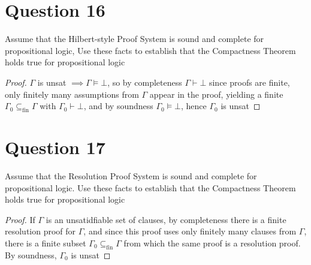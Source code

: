 \documentclass{article}
\begin{document}
\section*{Question 16}
Assume that the Hilbert-style Proof System is sound and complete for propositional logic, Use these facts to establish that the Compactness Theorem holds true for propositional logic
\begin{proof}
    $\Gamma$ is unsat $\implies\Gamma \models \bot$, so by completeness $\Gamma \vdash \bot$ since proofs are finite, only finitely many assumptions from $\Gamma$ appear in the proof, yielding a finite $\Gamma_0 \subseteq_{\mathrm{fin}} \Gamma$ with $\Gamma_0 \vdash \bot$, 
    and by soundness $\Gamma_0 \models \bot$, hence $\Gamma_0$ is unsat
    \end{proof}
\section*{Question 17}
Assume that the Resolution Proof System is sound and complete for propositional logic. Use these facts to establish that the Compactness Theorem holds true for propositional logic
\begin{proof}
    If $\Gamma$ is an unsatidfiable set of clauses, by completeness there is a finite resolution proof for $\Gamma$, and since this proof uses only finitely many clauses from $\Gamma$, there is a finite subset $\Gamma_0 \subseteq_{\mathrm{fin}} \Gamma$ from which the same proof is a resolution proof. 
    By soundness, $\Gamma_0$ is unsat
    \end{proof}
\end{document}
